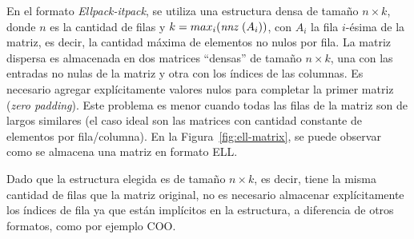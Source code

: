 En el formato \textit{Ellpack-itpack}, se utiliza una estructura densa de tamaño $n\times k$, donde $n$ es la cantidad de filas y $k = max_i(\textit{nnz }(A_i))$, con $A_i$ la fila $i$-ésima de la matriz, es decir, la cantidad máxima de elementos no nulos por fila. La matriz dispersa es almacenada en dos matrices ``densas'' de tamaño $n\times k$, una con las entradas no nulas de la matriz y otra con los índices de las columnas. Es necesario agregar explícitamente valores nulos para completar la primer matriz (\textit{zero padding}). Este problema es menor cuando todas las filas de la matriz son de largos similares (el caso ideal son las matrices con cantidad constante de elementos por fila/columna). En la Figura~\ref{fig:ell-matrix}, se puede observar como se almacena una matriz en formato ELL.

Dado que la estructura elegida es de tamaño $n \times k$, es decir, tiene la misma cantidad de filas que la matriz original, no es necesario almacenar explícitamente los índices de fila ya que están implícitos en la estructura, a diferencia de otros formatos, como por ejemplo COO.



